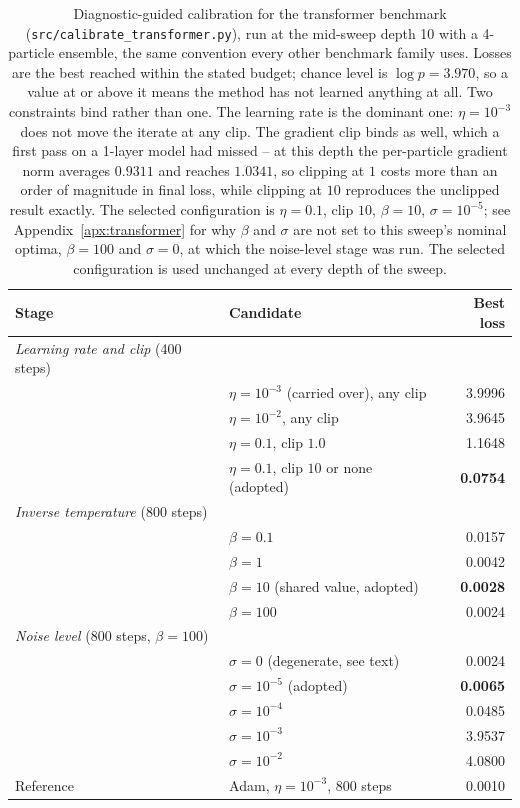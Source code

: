 \documentclass{article} %
\theoremstyle{plain}
\theoremstyle{definition}
\theoremstyle{remark}
\begin{document}
\begin{table}[!htbp]
\centering
\caption{Diagnostic-guided calibration for the transformer benchmark
(\texttt{src/calibrate\_transformer.py}), run at the mid-sweep depth 10 with a 4-particle ensemble,
the same convention every other benchmark family uses. Losses are the best reached within the
stated budget; chance level is $\log p=3.970$, so a value at or above it means the method has not
learned anything at all. Two constraints bind rather than one. The learning rate is the dominant
one: $\eta=10^{-3}$ does not move the iterate at any clip. The gradient clip binds as well, which a
first pass on a 1-layer model had missed -- at this depth the per-particle gradient norm averages
$0.9311$ and reaches $1.0341$, so clipping at $1$ costs more than an order of magnitude in final
loss, while clipping at $10$ reproduces the unclipped result exactly. The selected configuration is
$\eta=0.1$, clip $10$, $\beta=10$, $\sigma=10^{-5}$; see Appendix~\ref{apx:transformer} for why $\beta$
and $\sigma$ are not set to this sweep's nominal optima, $\beta=100$ and $\sigma=0$, at which the
noise-level stage was run. The selected configuration is used unchanged at every depth of the sweep.}
\label{tab:transformer_calibration}
\begin{tabular}{@{}llr@{}}
\toprule
\textbf{Stage} & \textbf{Candidate} & \textbf{Best loss} \\
\midrule
\emph{Learning rate and clip} (400 steps) & & \\
  & $\eta=10^{-3}$ (carried over), any clip & 3.9996 \\
  & $\eta=10^{-2}$, any clip                & 3.9645 \\
  & $\eta=0.1$, clip $1.0$                  & 1.1648 \\
  & $\eta=0.1$, clip $10$ or none (adopted) & \textbf{0.0754} \\
\midrule
\emph{Inverse temperature} (800 steps) & & \\
  & $\beta=0.1$   & 0.0157 \\
  & $\beta=1$     & 0.0042 \\
  & $\beta=10$ (shared value, adopted) & \textbf{0.0028} \\
  & $\beta=100$   & 0.0024 \\
\midrule
\emph{Noise level} (800 steps, $\beta=100$) & & \\
  & $\sigma=0$ (degenerate, see text) & 0.0024 \\
  & $\sigma=10^{-5}$ (adopted)        & \textbf{0.0065} \\
  & $\sigma=10^{-4}$                  & 0.0485 \\
  & $\sigma=10^{-3}$                  & 3.9537 \\
  & $\sigma=10^{-2}$                  & 4.0800 \\
\midrule
Reference & Adam, $\eta=10^{-3}$, 800 steps & 0.0010 \\
\bottomrule
\end{tabular}
\end{table}
\end{document}
